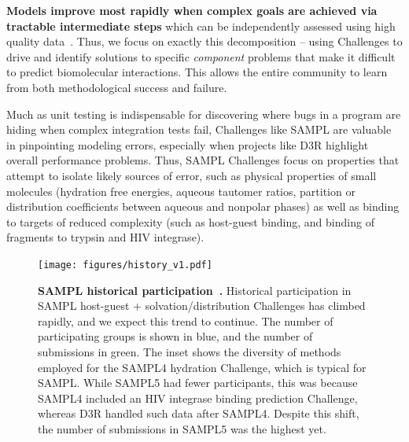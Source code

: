 \documentclass[11pt]{article}
\begin{document}
\textbf{Models improve most rapidly when complex goals are achieved via tractable intermediate steps} which can be independently assessed using high quality data~\cite{Saez-Rodriguez:2016:NatRevGenet}.
Thus, we focus on exactly this decomposition -- using Challenges to drive and identify solutions to specific \emph{component} problems that make it difficult to predict biomolecular interactions.
This allows the entire community to learn from both methodological success and failure. 

Much as unit testing is indispensable for discovering where bugs in a program are hiding when complex integration tests fail, Challenges like SAMPL are valuable in pinpointing modeling errors, especially when projects like D3R highlight overall performance problems.
Thus, SAMPL Challenges focus on properties that attempt to isolate likely sources of error, such as physical properties of small molecules (hydration free energies, aqueous tautomer ratios, partition or distribution coefficients between aqueous and nonpolar phases) as well as binding to targets of reduced complexity (such as host-guest binding, and binding of fragments to trypsin and HIV integrase).


\begin{figure}
\vspace{-0.2in}
\begin{centering}
\texttt{[image: figures/history\_v1.pdf]}

\end{centering}
\footnotesize
\caption{\label{figure:sampl_history}  
\textbf{SAMPL historical participation~\cite{mobley_blind_2014-1}.} 
Historical participation in SAMPL host-guest + solvation/distribution Challenges has climbed rapidly, and we expect this trend to continue. The number of participating groups is shown in blue, and the number of submissions in green. The inset shows the diversity of methods employed for the SAMPL4 hydration Challenge, which is typical for SAMPL. 
While SAMPL5 had fewer participants, this was because SAMPL4 included an HIV integrase binding prediction Challenge, whereas D3R handled such data after SAMPL4.
Despite this shift, the number of submissions in SAMPL5 was the highest yet.
}
\end{figure}
\end{document}

